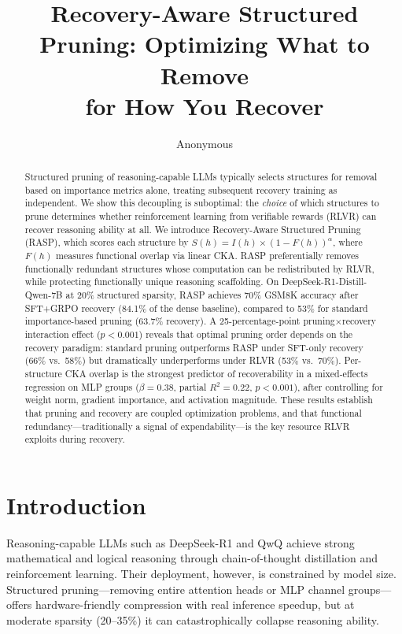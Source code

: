 \documentclass[11pt,a4paper]{article}
\title{Recovery-Aware Structured Pruning: Optimizing What to Remove\\for How You Recover}
\author{Anonymous}
\newcommand{\method}{RASP}
\newcommand{\score}{S(h)}
\newcommand{\importance}{I(h)}
\newcommand{\overlap}{F(h)}
\begin{document}
\maketitle

\begin{abstract}
Structured pruning of reasoning-capable LLMs typically selects structures for removal based on importance metrics alone, treating subsequent recovery training as independent. We show this decoupling is suboptimal: the \emph{choice} of which structures to prune determines whether reinforcement learning from verifiable rewards (RLVR) can recover reasoning ability at all. We introduce Recovery-Aware Structured Pruning (\method{}), which scores each structure by $\score{} = \importance{} \times (1 - \overlap{})^\alpha$, where $\overlap{}$ measures functional overlap via linear CKA. \method{} preferentially removes functionally redundant structures whose computation can be redistributed by RLVR, while protecting functionally unique reasoning scaffolding. On DeepSeek-R1-Distill-Qwen-7B at 20\% structured sparsity, \method{} achieves 70\% GSM8K accuracy after SFT+GRPO recovery (84.1\% of the dense baseline), compared to 53\% for standard importance-based pruning (63.7\% recovery). A 25-percentage-point pruning$\times$recovery interaction effect ($p < 0.001$) reveals that optimal pruning order depends on the recovery paradigm: standard pruning outperforms \method{} under SFT-only recovery (66\% vs.\ 58\%) but dramatically underperforms under RLVR (53\% vs.\ 70\%). Per-structure CKA overlap is the strongest predictor of recoverability in a mixed-effects regression on MLP groups ($\beta = 0.38$, partial $R^2 = 0.22$, $p < 0.001$), after controlling for weight norm, gradient importance, and activation magnitude. These results establish that pruning and recovery are coupled optimization problems, and that functional redundancy---traditionally a signal of expendability---is the key resource RLVR exploits during recovery.
\end{abstract}

\section{Introduction}
\label{sec:intro}

Reasoning-capable LLMs such as DeepSeek-R1 \cite{deepseek2025r1} and QwQ \cite{qwq2024} achieve strong mathematical and logical reasoning through chain-of-thought distillation and reinforcement learning. Their deployment, however, is constrained by model size. Structured pruning---removing entire attention heads or MLP channel groups---offers hardware-friendly compression with real inference speedup, but at moderate sparsity (20--35\%) it can catastrophically collapse reasoning ability.
\end{document}

